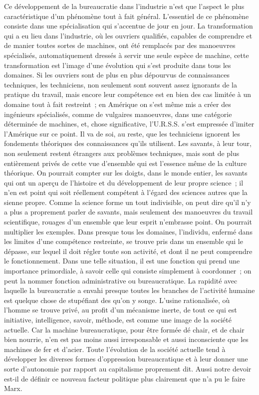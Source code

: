 \documentclass[french,twoside]{book} %
\begin{document}
Ce développement de la bureaucratie dans l'industrie n'est que l'aspect le plus caractéristique d'un phénomène tout à fait général. L'essentiel de ce phénomène consiste dans une spécialisation qui s'accentue de jour en jour. La transformation qui a eu lieu dans l'industrie, où les ouvriers qualifiés, capables de comprendre et de manier toutes sortes de machines, ont été remplacés par des manoeuvres spécialisés, automatiquement dressés à servir une seule espèce de machine, cette transformation est l'image d'une évolution qui s'est produite dans tous les domaines. Si les ouvriers sont de plus en plus dépourvus de connaissances techniques, les techniciens, non seulement sont souvent assez ignorants de la pratique du travail, mais encore leur compétence est en bien des cas limitée à un domaine tout à fait restreint ; en Amérique on s'est même mis a créer des ingénieurs spécialisés, comme de vulgaires manoeuvres, dans une catégorie déterminée de machines, et, chose significative, l'U.R.S.S. s'est empressée d'imiter l'Amérique sur ce point. Il va de soi, au reste, que les techniciens ignorent les fondements théoriques des connaissances qu'ils utilisent. Les savants, à leur tour, non seulement restent étrangers aux problèmes techniques, mais sont de plus entièrement privés de cette vue d'ensemble qui est l'essence même de la culture théorique. On pourrait compter sur les doigts, dans le monde entier, les savants qui ont un aperçu de l'histoire et du développement de leur propre science ; il n'en est point qui soit réellement compétent à l'égard des sciences autres que la sienne propre. Comme la science forme un tout indivisible, on peut dire qu'il n'y a plus a proprement parler de savants, mais seulement des manoeuvres du travail scientifique, rouages d'un ensemble que leur esprit n'embrasse point. On pourrait multiplier les exemples. Dans presque tous les domaines, l'individu, enfermé dans les limites d'une compétence restreinte, se trouve pris dans un ensemble qui le dépasse, sur lequel il doit régler toute son activité, et dont il ne peut comprendre le fonctionnement. Dans une telle situation, il est une fonction qui prend une importance primordiale, à savoir celle qui consiste simplement à coordonner ; on peut la nommer fonction administrative ou bureaucratique. La rapidité avec laquelle la bureaucratie a envahi presque toutes les branches de l'activité humaine est quelque chose de stupéfiant des qu'on y songe. L'usine rationalisée, où l'homme se trouve privé, au profit d'un mécanisme inerte, de tout ce qui est initiative, intelligence, savoir, méthode, est comme une image de la société actuelle. Car la machine bureaucratique, pour être formée dé chair, et de chair bien nourrie, n'en est pas moins aussi irresponsable et aussi inconsciente que les machines de fer et d'acier. Toute l'évolution de la société actuelle tend à développer les diverses formes d'oppression bureaucratique et à leur donner une sorte d'autonomie par rapport au capitalisme proprement dit. Aussi notre devoir est-il de définir ce nouveau facteur politique plus clairement que n'a pu le faire Marx.\par
\end{document}
